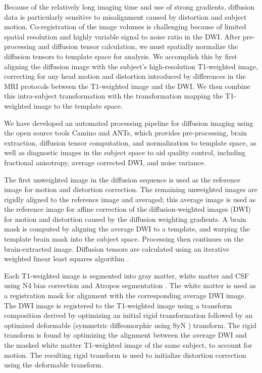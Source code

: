 Because of the relatively long imaging time and use of strong gradients, diffusion data is particularly sensitive to misalignment caused by distortion and subject motion. Co-registration of the image volumes is challenging because of limited spatial resolution and highly variable signal to noise ratio in the DWI. After pre-processing and diffusion tensor calculation, we must spatially normalize the diffusion tensors to template space for analysis. We accomplish this by first aligning the diffusion image with the subject's high-resolution T1-weighted image, correcting for any head motion and distortion introduced by differences in the MRI protocols between the T1-weighted image and the DWI. We then combine this intra-subject transformation with the transformation mapping the T1-weighted image to the template space. 

We have developed an automated processing pipeline for diffusion imaging using the open source tools Camino \cite{Cook2006} and ANTs, which provides pre-processing, brain extraction, diffusion tensor computation, and normalization to template space, as well as diagnostic images in the subject space to aid quality control, including fractional anisotropy, average corrected DWI, and noise variance.

The first unweighted image in the diffusion sequence is used as the reference image for motion and distortion correction. The remaining unweighted images are rigidly aligned to the reference image and averaged; this average image is used as the reference image for affine correction of the diffusion-weighted images (DWI) for motion and distortion caused by the diffusion weighting gradients. A brain mask is computed by aligning the average DWI to a template, and warping the template brain mask into the subject space. Processing then continues on the brain-extracted image. Diffusion tensors are calculated using an iterative weighted linear least squares algorithm \cite{Salvador2005}.

Each T1-weighted image is segmented into gray matter, white matter and CSF using N4 bias correction \cite{Tustison2010} and Atropos segmentation \cite{Avants2011a}. The white matter is used as a registration mask for alignment with the corresponding average DWI image. The DWI image is registered to the T1-weighted image using a transform composition derived by optimizing an initial rigid transformation followed by an optimized deformable (symmetric diffeomorphic using SyN \cite{Avants2011}) transform. The rigid transform is found by optimizing the alignment between the average DWI and the masked white matter T1-weighted image of the same subject, to account for motion. The resulting rigid transform is used to initialize distortion correction using the deformable transform.

